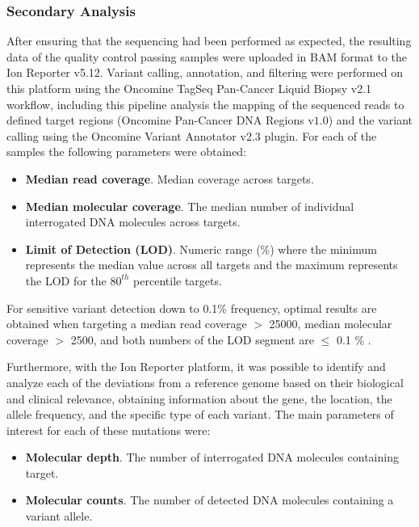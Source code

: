 \subsubsection{Secondary Analysis} \label{Secondary_analysis}

After ensuring that the sequencing had been performed as expected, the resulting data of the quality control passing samples were uploaded in BAM format to the Ion Reporter\texttrademark{} v5.12. Variant calling, annotation, and filtering were performed on this platform using the Oncomine\texttrademark{} TagSeq Pan-Cancer Liquid Biopsy v2.1 workflow, including this pipeline analysis the mapping of the sequenced reads to defined target regions (Oncomine\texttrademark{} Pan-Cancer DNA Regions v$1.0$) and the variant calling using the Oncomine\texttrademark{} Variant Annotator v2.3 plugin. For each of the samples the following parameters were obtained:
\begin{itemize}
    \item \textbf{Median read coverage}. Median coverage across targets.
    \item \textbf{Median molecular coverage}. The median number of individual interrogated DNA molecules across targets.
    \item \textbf{Limit of Detection (LOD)}. Numeric range (\%) where the minimum represents the median value across all targets and the maximum represents the LOD for the $80^{th}$ percentile targets.
\end{itemize}

For sensitive variant detection down to 0.1\% frequency, optimal results are obtained when targeting a median read coverage $>$ 25000, median molecular coverage $>$ 2500, and both numbers of the LOD segment are $\le$ 0.1 \% \cite{Oncomine_PanCancer}.

Furthermore, with the Ion Reporter\texttrademark{} platform, it was possible to identify and analyze each of the deviations from a reference genome based on their biological and clinical relevance, obtaining information about the gene, the location, the allele frequency, and the specific type of each variant. The main parameters of interest for each of these mutations were:
\begin{itemize}
    \item \textbf{Molecular depth}. The number of interrogated DNA molecules containing target.
    \item \textbf{Molecular counts}. The number of detected DNA molecules containing a variant allele.
\end{itemize}

